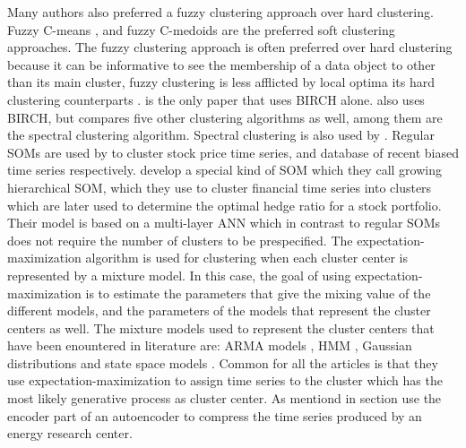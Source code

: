 Many authors also preferred a fuzzy clustering approach over hard clustering. 
Fuzzy C-means \cite{temporal_tsc_threshold_ar_models, wavelet_multivar_tsc_multi_pca, fuzzy_c_means_pso_svd, struct_damage_ar_fuzzy_c_means},
and fuzzy C-medoids \cite{garch_robust_tsc, copula_fuzzy_tsc_spatial, tsc_ar_metric_air_pollution, ar_metric_trimmed_fuzzy_tsc_pm10} 
are the preferred soft clustering approaches.
The fuzzy clustering approach is often preferred over hard clustering because
it can be informative to see the membership of a data object to other than its main cluster, fuzzy clustering is less afflicted by local optima 
its hard clustering counterparts \cite{garch_robust_tsc}.
\textcite{svd_birch_tsc_stock_price} is the only paper that uses BIRCH alone. 
\textcite{auto_encoder_many_tsc_algorithms} also uses BIRCH, but compares five other clustering algorithms as well, among them are the spectral clustering algorithm. 
Spectral clustering is also used by \textcite{temporal_tsc_threshold_ar_models, fragmented_periodogram}.
Regular SOMs are used by \textcite{stock_price_tsc_regr_trees_som, dwt_hac_kmeans_som} to cluster stock price time series, and database of recent biased time series respectively. 
\textcite{ghsom_optimal_hedge_ratio} develop a special kind of SOM which they call growing hierarchical SOM, which they use to cluster financial time series into clusters which are later used to determine the optimal hedge ratio for a stock portfolio. 
Their model is based on a multi-layer ANN which in contrast to regular SOMs does not require the number of clusters to be prespecified. 
The expectation-maximization algorithm is used for clustering when each cluster center is represented by a mixture model. 
In this case, the goal of using expectation-maximization is to estimate the parameters that give the mixing value of the different models, 
and the parameters of the models that represent the cluster centers as well. 
The mixture models used to represent the cluster centers that have been enountered in literature are: ARMA models \cite{moar_mpl_tsc}, HMM \cite{mixture_gaussian_hmm}, Gaussian distributions \cite{auto_encoder_many_tsc_algorithms} and state space models \cite{hier_clust_w_state_space_models}.
Common for all the articles is that they use expectation-maximization to assign time series to the cluster which has the most likely generative process as cluster center.
As mentiond in section \textcite{auto_encoder_many_tsc_algorithms} use the encoder part of an autoencoder to compress the time series produced by an energy research center. 
